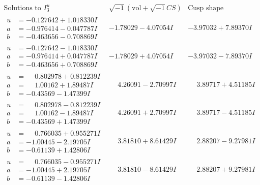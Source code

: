 \documentclass[1p]{elsarticle_modified}
\theoremstyle{definition}
\newcommand{\I}{\sqrt{-1}}
\begin{document}
$$\begin{array}{c|c|c}  
\text{Solutions to }I^u_{3}& \I (\text{vol} + \sqrt{-1}CS) & \text{Cusp shape}\\
 \hline 
\begin{aligned}
u &= -0.127642 + 1.018330 I \\
a &= -0.976414 - 0.047787 I \\
b &= -0.463656 - 0.708869 I\end{aligned}
 & -1.78029 - 4.07054 I & -3.97032 + 7.89370 I \\ \hline\begin{aligned}
u &= -0.127642 - 1.018330 I \\
a &= -0.976414 + 0.047787 I \\
b &= -0.463656 + 0.708869 I\end{aligned}
 & -1.78029 + 4.07054 I & -3.97032 - 7.89370 I \\ \hline\begin{aligned}
u &= \phantom{-}0.802978 + 0.812239 I \\
a &= \phantom{-}1.00162 + 1.89487 I \\
b &= -0.43569 - 1.47399 I\end{aligned}
 & \phantom{-}4.26091 - 2.70997 I & \phantom{-}3.89717 + 4.51185 I \\ \hline\begin{aligned}
u &= \phantom{-}0.802978 - 0.812239 I \\
a &= \phantom{-}1.00162 - 1.89487 I \\
b &= -0.43569 + 1.47399 I\end{aligned}
 & \phantom{-}4.26091 + 2.70997 I & \phantom{-}3.89717 - 4.51185 I \\ \hline\begin{aligned}
u &= \phantom{-}0.766035 + 0.955271 I \\
a &= -1.00445 - 2.19705 I \\
b &= -0.61139 + 1.42806 I\end{aligned}
 & \phantom{-}3.81810 + 8.61429 I & \phantom{-}2.88207 - 9.27981 I \\ \hline\begin{aligned}
u &= \phantom{-}0.766035 - 0.955271 I \\
a &= -1.00445 + 2.19705 I \\
b &= -0.61139 - 1.42806 I\end{aligned}
 & \phantom{-}3.81810 - 8.61429 I & \phantom{-}2.88207 + 9.27981 I \\ \hline\begin{aligned}

\end{aligned}
\end{array}$$
\end{document}
